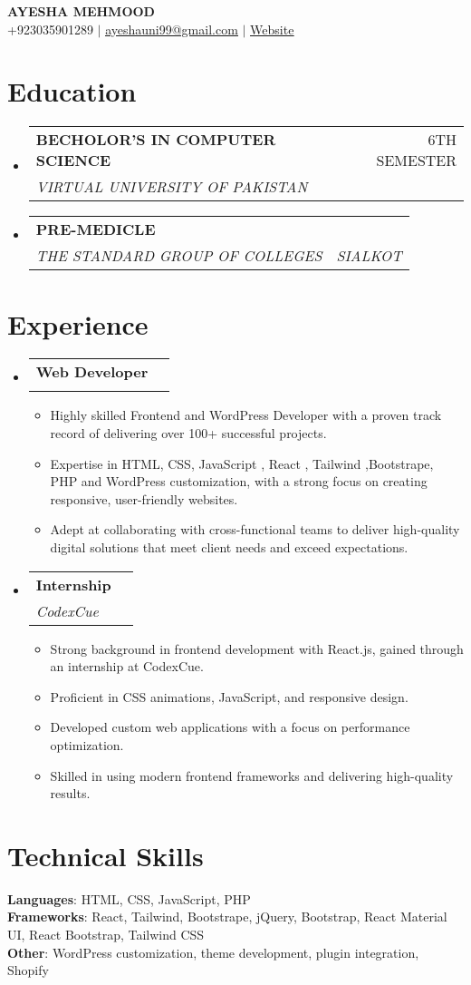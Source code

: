 \documentclass[letterpaper,11pt]{article}
\makeatletter
\newcommand{\resumeItem}[1]{
  \item\small{
    {#1 \vspace{-2pt}}
  }
}
\newcommand{\resumeSubheading}[4]{
  \vspace{-2pt}\item
    \begin{tabular*}{0.97\textwidth}[t]{l@{\extracolsep{\fill}}r}
      \textbf{#1} & #2 \\
      \textit{\small#3} & \textit{\small #4} \\
    \end{tabular*}\vspace{-7pt}
}
\newcommand{\resumeSubHeadingListStart}{\begin{itemize}[leftmargin=0.15in, label={}]}
\newcommand{\resumeSubHeadingListEnd}{\end{itemize}}
\newcommand{\resumeItemListStart}{\begin{itemize}}
\newcommand{\resumeItemListEnd}{\end{itemize}\vspace{-5pt}}
\makeatother
\begin{document}
\begin{center}
    \textbf{\Huge \scshape AYESHA MEHMOOD} \\ \vspace{1pt}
    \small +923035901289 $|$ \href{mailto:ayeshauni99@gmail.com}{\underline{ayeshauni99@gmail.com}} $|$ \href{https://ayeshamehmood.netlify.app/}{\underline{Website}}
\end{center}

\section{Education}
  \resumeSubHeadingListStart
    \resumeSubheading
      {BECHOLOR’S IN COMPUTER SCIENCE}{6TH SEMESTER}
      {VIRTUAL UNIVERSITY OF PAKISTAN}{}
    \resumeSubheading
      {PRE-MEDICLE}{}
      {THE STANDARD GROUP OF COLLEGES}{SIALKOT}
  \resumeSubHeadingListEnd

\section{Experience}
  \resumeSubHeadingListStart
    \resumeSubheading
      {Web Developer}{}
      {}{}
      \resumeItemListStart
        \resumeItem{Highly skilled Frontend and WordPress Developer with a proven track record of delivering over 100+ successful projects.}
        \resumeItem{Expertise in HTML, CSS, JavaScript , React , Tailwind ,Bootstrape, PHP and WordPress customization, with a strong focus on creating responsive, user-friendly websites.}
        \resumeItem{Adept at collaborating with cross-functional teams to deliver high-quality digital solutions that meet client needs and exceed expectations.}
      \resumeItemListEnd
    \resumeSubheading
      {Internship}{}
      {CodexCue}{}
      \resumeItemListStart
        \resumeItem{Strong background in frontend development with React.js, gained through an internship at CodexCue.}
        \resumeItem{Proficient in CSS animations, JavaScript, and responsive design.}
        \resumeItem{Developed custom web applications with a focus on performance optimization.}
        \resumeItem{Skilled in using modern frontend frameworks and delivering high-quality results.}
      \resumeItemListEnd
  \resumeSubHeadingListEnd

\section{Technical Skills}
 \begin{itemize}[leftmargin=0.15in, label={}]
    \small{\item{
     \textbf{Languages}: HTML, CSS, JavaScript, PHP \\
     \textbf{Frameworks}: React, Tailwind, Bootstrape, jQuery, Bootstrap, React Material UI, React Bootstrap, Tailwind CSS \\
     \textbf{Other}: WordPress customization, theme development, plugin integration, Shopify
    }}
 \end{itemize}
\end{document}
